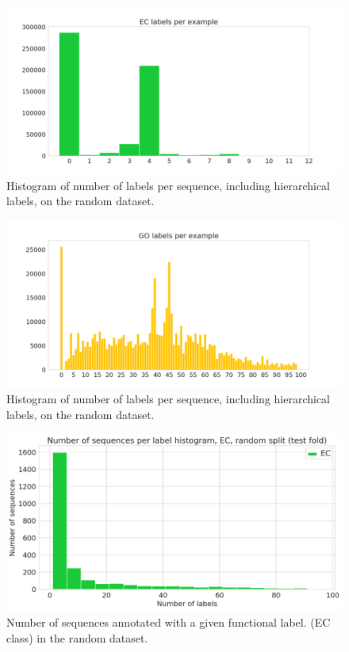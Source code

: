 \clearpage
\DIFaddend \begin{figure}[htbp]
\centering
  \DIFdelbeginFL %
\DIFdelendFL \DIFaddbeginFL \includegraphics[width=\textwidth]{ec_label_distribution.png}
  \DIFaddendFL \caption{Histogram of number of labels per sequence, including hierarchical labels, on the random dataset.}
\end{figure}
\begin{figure}[htbp]
\centering
  \DIFdelbeginFL %
\DIFdelendFL \DIFaddbeginFL \includegraphics[width=\textwidth]{go_label_distribution.png}
  \DIFaddendFL \caption{Histogram of number of labels per sequence, including hierarchical labels, on the random dataset.}
\end{figure}
\begin{figure}[htbp]
\centering
  \DIFdelbeginFL %
\DIFdelendFL \DIFaddbeginFL \includegraphics[width=\textwidth]{sequences_per_label_ec_random.png}
  \DIFaddendFL \caption{Number of sequences annotated with a given functional label. (EC class) in the random dataset.}
\end{figure}
